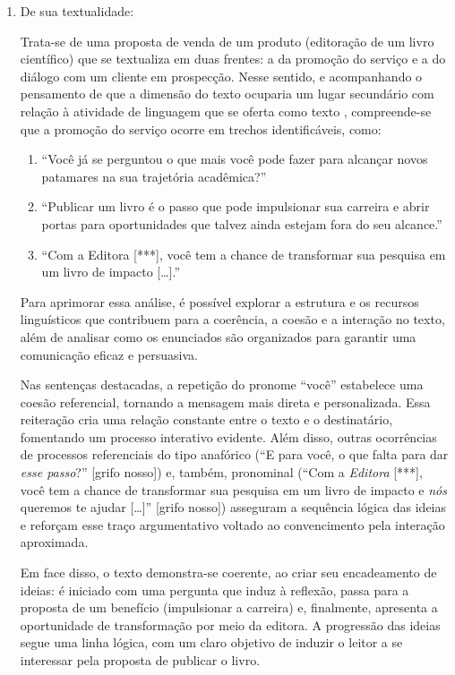 \documentclass[portuguese]{textolivre}
\begin{document}
\begin{enumerate}
    \item De sua textualidade:
    
Trata-se de uma proposta de venda de um produto (editoração de um livro científico) que se textualiza em duas frentes: a da promoção do serviço e a do diálogo com um cliente em prospecção. Nesse sentido, e acompanhando o pensamento de que a dimensão do texto ocuparia um lugar secundário com relação à atividade de linguagem que se oferta como texto \cite{antunes2017textualidade}, compreende-se que a promoção do serviço ocorre em trechos identificáveis, como:

\begin{enumerate}
    \item  “Você já se perguntou o que mais você pode fazer para alcançar novos patamares na sua trajetória acadêmica?”
    \item “Publicar um livro é o passo que pode impulsionar sua carreira e abrir portas para oportunidades que talvez ainda estejam fora do seu alcance.”
    \item “Com a Editora [***], você tem a chance de transformar sua pesquisa em um livro de impacto […].”
\end{enumerate}

Para aprimorar essa análise, é possível explorar a estrutura e os recursos linguísticos que contribuem para a coerência, a coesão e a interação no texto, além de analisar como os enunciados são organizados para garantir uma comunicação eficaz e persuasiva.

Nas sentenças destacadas, a repetição do pronome “você” estabelece uma coesão referencial, tornando a mensagem mais direta e personalizada. Essa reiteração cria uma relação constante entre o texto e o destinatário, fomentando um processo interativo evidente. Além disso, outras ocorrências de processos referenciais do tipo anafórico (“E para você, o que falta para dar \textit{esse passo}?” [grifo nosso]) e, também, pronominal (“Com a \textit{Editora} [***], você tem a chance de transformar sua pesquisa em um livro de impacto e \textit{nós} queremos te ajudar […]” [grifo nosso]) asseguram a sequência lógica das ideias e reforçam esse traço argumentativo voltado ao convencimento pela interação aproximada.

Em face disso, o texto demonstra-se coerente, ao criar seu encadeamento de ideias: é iniciado com uma pergunta que induz à reflexão, passa para a proposta de um benefício (impulsionar a carreira) e, finalmente, apresenta a oportunidade de transformação por meio da editora. A progressão das ideias segue uma linha lógica, com um claro objetivo de induzir o leitor a se interessar pela proposta de publicar o livro.


\end{enumerate}
\end{document}
